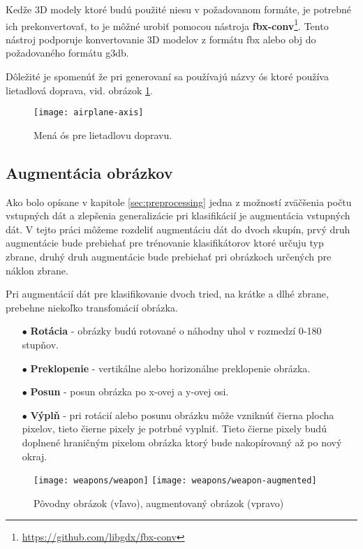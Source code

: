 Kedže 3D modely ktoré budú použité niesu v požadovanom formáte, je potrebné ich prekonvertovať, to je môžné urobiť
    pomocou nástroja \textbf{fbx-conv}\footnote{\url{https://github.com/libgdx/fbx-conv}}.
Tento nástroj podporuje konvertovanie 3D modelov z formátu fbx alebo obj do požadovaného formátu g3db.

Dôležité je spomenúť že pri generovaní sa používajú názvy ós ktoré používa lietadlová doprava, vid. obrázok \ref{pic:airplaneaxis}.
\begin{figure}[H]
    \centering
    \texttt{[image: airplane-axis]}
    \caption{Mená ós pre lietadlovu dopravu.}
    \label{pic:airplaneaxis}
\end{figure}

\subsection{Augmentácia obrázkov}
Ako bolo opísane v kapitole \ref{sec:preprocessing} jedna z možností zväčšenia počtu vstupných dát a zlepšenia generalizácie pri klasifikácií je augmentácia vstupných dát.
V tejto práci môžeme rozdeliť augmentáciu dát do dvoch skupín, prvý druh augmentácie bude prebiehať pre trénovanie klasifikátorov ktoré
    určuju typ zbrane, druhý druh augmentácie bude prebiehať pri obrázkoch určených pre náklon zbrane.

Pri augmentácií dát pre klasifikovanie dvoch tried, na krátke a dlhé zbrane, prebehne niekoľko transfomácií obrázka.
\begin{enumerate}
    \item[$\bullet$] \textbf{Rotácia} - obrázky budú rotované o náhodny uhol v rozmedzí 0-180 stupňov.
    \item[$\bullet$] \textbf{Preklopenie} - vertikálne alebo horizonálne preklopenie obrázka.
    \item[$\bullet$] \textbf{Posun} - posun obrázka po x-ovej a y-ovej osi.
    \item[$\bullet$] \textbf{Výplň} - pri rotácií alebo posunu obrázku môže vzniknúť čierna plocha pixelov, tieto čierne pixely je potrbné vyplniť.
    Tieto čierne pixely budú doplnené hraničným pixelom obrázka ktorý bude nakopírovaný až po nový okraj.
\end{enumerate}

\begin{figure}[H]
    \centering
    \texttt{[image: weapons/weapon]}
    \qquad
    \texttt{[image: weapons/weapon-augmented]}
    \caption{Pôvodny obrázok (vľavo), augmentovaný obrázok (vpravo)}
    \label{pic:imageAugmented}
\end{figure}

